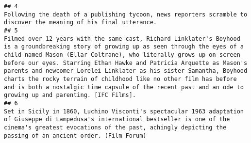 \documentclass[
]{article}
\begin{document}
\begin{verbatim}
## 4                                                                                                                                                                                                                                                                                                                                                                                                                                                                                                                                                                                                                                                                                                                                                                                                                                                                                                             Following the death of a publishing tycoon, news reporters scramble to discover the meaning of his final utterance.
## 5                                                                                                                                                                                                                                                                                                                                                                                                                                                                                  Filmed over 12 years with the same cast, Richard Linklater's Boyhood is a groundbreaking story of growing up as seen through the eyes of a child named Mason (Ellar Coltrane), who literally grows up on screen before our eyes. Starring Ethan Hawke and Patricia Arquette as Mason's parents and newcomer Lorelei Linklater as his sister Samantha, Boyhood charts the rocky terrain of childhood like no other film has before and is both a nostalgic time capsule of the recent past and an ode to growing up and parenting. [IFC Films].
## 6                                                                                                                                                                                                                                                                                                                                                                                                                                                                                                                                                                                                                                                                                                                                                                              Set in Sicily in 1860, Luchino Visconti's spectacular 1963 adaptation of Giuseppe di Lampedusa's international bestseller is one of the cinema's greatest evocations of the past, achingly depicting the passing of an ancient order. (Film Forum)
\end{verbatim}
\end{document}

